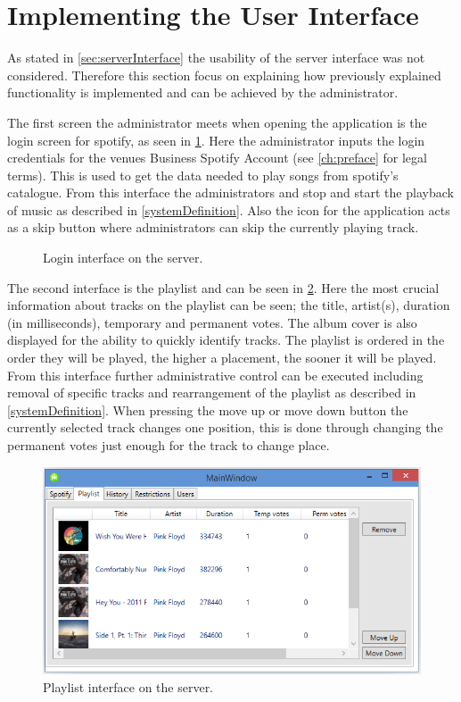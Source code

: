 \section{Implementing the User Interface}\label{sec:impinterface}
As stated in \cref{sec:serverInterface} the usability of the server interface was not considered. Therefore this section focus on explaining how previously explained functionality is implemented and can be achieved by the administrator.

The first screen the administrator meets when opening the application is the login screen for spotify, as seen in \cref{fig:loginInterface}. Here the administrator inputs the login credentials for the venues Business Spotify Account (see \cref{ch:preface} for legal terms). This is used to get the data needed to play songs from spotify's catalogue. From this interface the administrators and stop and start the playback of music as described in \cref{systemDefinition}. Also the icon for the application acts as a skip button where administrators can skip the currently playing track.

\begin{figure}[H]
  \centering
  \caption{Login interface on the server.}\label{fig:loginInterface}
\end{figure}

The second interface is the playlist and can be seen in \cref{fig:ServerInterfacePlaylist}. Here the most crucial information about tracks on the playlist can be seen; the title, artist(s), duration (in milliseconds), temporary and permanent votes. The album cover is also displayed for the ability to quickly identify tracks. The playlist is ordered in the order they will be played, the higher a placement, the sooner it will be played. From this interface further administrative control can be executed including removal of specific tracks and rearrangement of the playlist as described in \cref{systemDefinition}. When pressing the move up or move down button the currently selected track changes one position, this is done through changing the permanent votes just enough for the track to change place.

\begin{figure}[hbtp]
  \centering
  \includegraphics[width=\textwidth]{Images/ServerInterfacePlaylist.png}
  \caption{Playlist interface on the server.}\label{fig:ServerInterfacePlaylist}
\end{figure}

